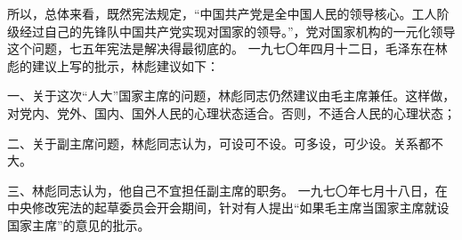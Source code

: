\begin{maonote}
所以，总体来看，既然宪法规定，“中国共产党是全中国人民的领导核心。工人阶级经过自己的先锋队中国共产党实现对国家的领导。”，党对国家机构的一元化领导这个问题，七五年宪法是解决得最彻底的。
一九七〇年四月十二日，毛泽东在林彪的建议上写的批示，林彪建议如下：

一、关于这次“人大”国家主席的问题，林彪同志仍然建议由毛主席兼任。这样做，对党内、党外、国内、国外人民的心理状态适合。否则，不适合人民的心理状态；

二、关于副主席问题，林彪同志认为，可设可不设。可多设，可少设。关系都不大。

三、林彪同志认为，他自己不宜担任副主席的职务。
一九七〇年七月十八日，在中央修改宪法的起草委员会开会期间，针对有人提出“如果毛主席当国家主席就设国家主席”的意见的批示。
\end{maonote}
